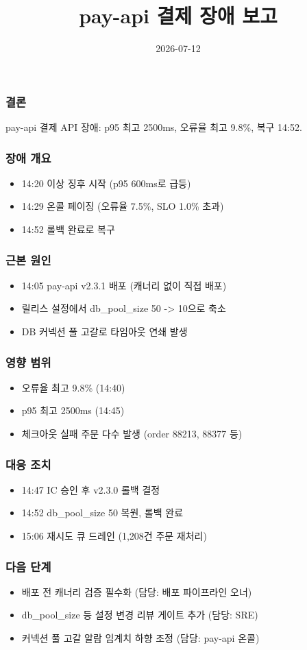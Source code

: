 \documentclass[aspectratio=169]{beamer}
\title{pay-api 결제 장애 보고}
\date{2026-07-12}
\begin{document}
\begin{frame}
\frametitle{결론}
\noindent\par
pay-api 결제 API 장애: p95 최고 2500ms, 오류율 최고 9.8\%, 복구 14:52.
\end{frame}

\begin{frame}
\frametitle{장애 개요}
\noindent\par
\begin{itemize}
\item 14:20 이상 징후 시작 (p95 600ms로 급등)
\item 14:29 온콜 페이징 (오류율 7.5\%, SLO 1.0\% 초과)
\item 14:52 롤백 완료로 복구
\end{itemize}
\end{frame}

\begin{frame}
\frametitle{근본 원인}
\begin{itemize}
\item 14:05 pay-api v2.3.1 배포 (캐너리 없이 직접 배포)
\item 릴리스 설정에서 db\_pool\_size 50 -> 10으로 축소
\item DB 커넥션 풀 고갈로 타임아웃 연쇄 발생
\end{itemize}
\end{frame}

\begin{frame}
\frametitle{영향 범위}
\noindent\par
\begin{itemize}
\item 오류율 최고 9.8\% (14:40)
\item p95 최고 2500ms (14:45)
\item 체크아웃 실패 주문 다수 발생 (order 88213, 88377 등)
\end{itemize}
\end{frame}

\begin{frame}
\frametitle{대응 조치}
\begin{itemize}
\item 14:47 IC 승인 후 v2.3.0 롤백 결정
\item 14:52 db\_pool\_size 50 복원, 롤백 완료
\item 15:06 재시도 큐 드레인 (1,208건 주문 재처리)
\end{itemize}
\end{frame}

\begin{frame}
\frametitle{다음 단계}
\begin{itemize}
\item 배포 전 캐너리 검증 필수화 (담당: 배포 파이프라인 오너)
\item db\_pool\_size 등 설정 변경 리뷰 게이트 추가 (담당: SRE)
\item 커넥션 풀 고갈 알람 임계치 하향 조정 (담당: pay-api 온콜)
\end{itemize}
\end{frame}
\end{document}
